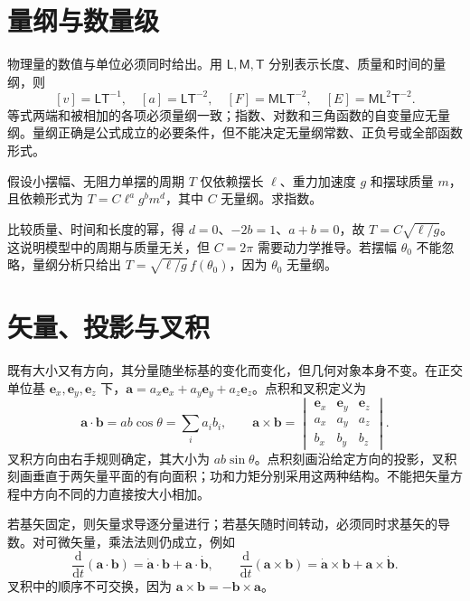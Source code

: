 \documentclass[UTF8,12pt,a4paper,fontset=fandol]{ctexbook}
\begin{document}
\section{量纲与数量级}
物理量的数值与单位必须同时给出。用 $\mathsf L,\mathsf M,\mathsf T$ 分别表示长度、质量和时间的量纲，则
\[
 [v]=\mathsf L\mathsf T^{-1},\quad [a]=\mathsf L\mathsf T^{-2},\quad
 [F]=\mathsf M\mathsf L\mathsf T^{-2},\quad [E]=\mathsf M\mathsf L^2\mathsf T^{-2}.
\]
等式两端和被相加的各项必须量纲一致；指数、对数和三角函数的自变量应无量纲。量纲正确是公式成立的必要条件，但不能决定无量纲常数、正负号或全部函数形式。

\begin{example}[用量纲限制单摆周期]
假设小摆幅、无阻力单摆的周期 $T$ 仅依赖摆长 $\ell$、重力加速度 $g$ 和摆球质量 $m$，且依赖形式为 $T=C\ell^a g^b m^d$，其中 $C$ 无量纲。求指数。
\end{example}
\begin{solve}
比较质量、时间和长度的幂，得 $d=0$、$-2b=1$、$a+b=0$，故 $T=C\sqrt{\ell/g}$。这说明模型中的周期与质量无关，但 $C=2\pi$ 需要动力学推导。若摆幅 $\theta_0$ 不能忽略，量纲分析只给出 $T=\sqrt{\ell/g}\,f(\theta_0)$，因为 $\theta_0$ 无量纲。
\end{solve}

\section{矢量、投影与叉积}
既有大小又有方向，其分量随坐标基的变化而变化，但几何对象本身不变。在正交单位基 $\mathbf e_x,\mathbf e_y,\mathbf e_z$ 下，$\mathbf a=a_x\mathbf e_x+a_y\mathbf e_y+a_z\mathbf e_z$。点积和叉积定义为
\[
 \mathbf a\cdot\mathbf b=ab\cos\theta=\sum_i a_i b_i,\qquad
 \mathbf a\times\mathbf b=
 \begin{vmatrix}\mathbf e_x&\mathbf e_y&\mathbf e_z\\a_x&a_y&a_z\\b_x&b_y&b_z\end{vmatrix}.
\]
叉积方向由右手规则确定，其大小为 $ab\sin\theta$。点积刻画沿给定方向的投影，叉积刻画垂直于两矢量平面的有向面积；功和力矩分别采用这两种结构。不能把矢量方程中方向不同的力直接按大小相加。

若基矢固定，则矢量求导逐分量进行；若基矢随时间转动，必须同时求基矢的导数。对可微矢量，乘法法则仍成立，例如
\[
 \frac{\mathrm d}{\mathrm dt}(\mathbf a\cdot\mathbf b)=\dot{\mathbf a}\cdot\mathbf b+\mathbf a\cdot\dot{\mathbf b},\qquad
 \frac{\mathrm d}{\mathrm dt}(\mathbf a\times\mathbf b)=\dot{\mathbf a}\times\mathbf b+\mathbf a\times\dot{\mathbf b}.
\]
叉积中的顺序不可交换，因为 $\mathbf a\times\mathbf b=-\mathbf b\times\mathbf a$。
\end{document}
